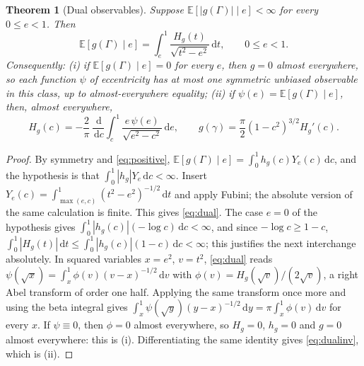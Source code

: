 \documentclass[11pt,a4paper]{article}
\newtheorem{theorem}{Theorem}[section]
\theoremstyle{remark}\newtheorem{remark}[theorem]{Remark}
\newcommand{\E}{\mathbb E}
\newcommand{\dd}{\,\mathrm d}
\begin{document}
\begin{theorem}[Dual observables]\label{thm:dual}
Suppose $\E[|g(\Gamma)|\mid e]<\infty$ for every $0\le e<1$. Then
\begin{equation}\label{eq:dual}
\E[g(\Gamma)\mid e]=\int_e^1\frac{H_g(t)}{\sqrt{t^2-e^2}}\dd t,\qquad 0\le e<1.
\end{equation}
Consequently: (i) if $\E[g(\Gamma)\mid e]=0$ for every $e$, then $g=0$ almost everywhere, so each function $\psi$ of eccentricity has at most one symmetric unbiased observable in this class, up to almost-everywhere equality; (ii) if $\psi(e)=\E[g(\Gamma)\mid e]$, then, almost everywhere,
\begin{equation}\label{eq:dualinv}
H_g(c)=-\frac2\pi\,\frac{\dd}{\dd c}\int_c^1\frac{e\,\psi(e)}{\sqrt{e^2-c^2}}\dd e,\qquad
g(\gamma)=\frac\pi2(1-c^2)^{3/2}H_g'(c).
\end{equation}
\end{theorem}

\begin{proof}
By symmetry and \eqref{eq:positive}, $\E[g(\Gamma)\mid e]=\int_0^1h_g(c)Y_e(c)\dd c$, and the hypothesis is that $\int_0^1|h_g|Y_e\dd c<\infty$. Insert $Y_e(c)=\int_{\max(e,c)}^1(t^2-e^2)^{-1/2}\dd t$ and apply Fubini; the absolute version of the same calculation is finite. This gives \eqref{eq:dual}. The case $e=0$ of the hypothesis gives $\int_0^1|h_g(c)|(-\log c)\dd c<\infty$, and since $-\log c\ge1-c$, $\int_0^1|H_g(t)|\dd t\le\int_0^1|h_g(c)|(1-c)\dd c<\infty$; this justifies the next interchange absolutely. In squared variables $x=e^2$, $v=t^2$, \eqref{eq:dual} reads $\psi(\sqrt x)=\int_x^1\phi(v)(v-x)^{-1/2}\dd v$ with $\phi(v)=H_g(\sqrt v)/(2\sqrt v)$, a right Abel transform of order one half. Applying the same transform once more and using the beta integral gives $\int_x^1\psi(\sqrt y)(y-x)^{-1/2}\dd y=\pi\int_x^1\phi(v)\dd v$ for every $x$. If $\psi\equiv0$, then $\phi=0$ almost everywhere, so $H_g=0$, $h_g=0$ and $g=0$ almost everywhere: this is (i). Differentiating the same identity gives \eqref{eq:dualinv}, which is (ii).
\end{proof}
\end{document}
